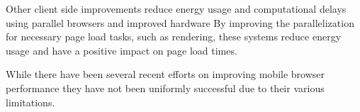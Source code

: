 Other client side improvements reduce energy usage and computational delays using parallel
browsers \cite{mai2012hotpar, meyerovich2010www} %
and improved hardware \cite{zhu2013hpca} %
 By improving the parallelization 
for necessary page load tasks, such as rendering, these systems reduce energy usage
and have a positive impact on page load times. 

While there have been several recent efforts on improving mobile browser performance
they have not been uniformly successful due to their various limitations.

